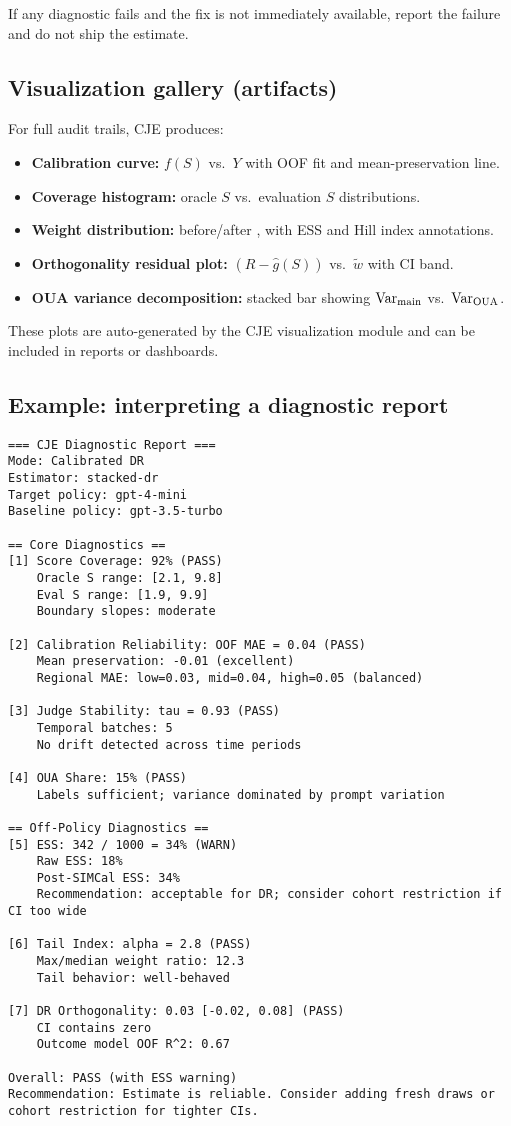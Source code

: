 If any diagnostic fails and the fix is not immediately available, report the failure and do not ship the estimate.

\subsection{Visualization gallery (artifacts)}

For full audit trails, CJE produces:
\begin{itemize}
\item \textbf{Calibration curve:} $f(S)$ vs.\ $Y$ with OOF fit and mean-preservation line.
\item \textbf{Coverage histogram:} oracle $S$ vs.\ evaluation $S$ distributions.
\item \textbf{Weight distribution:} before/after \simcal, with ESS and Hill index annotations.
\item \textbf{Orthogonality residual plot:} $(R - \hat{g}(S))$ vs.\ $\tilde{w}$ with CI band.
\item \textbf{OUA variance decomposition:} stacked bar showing $\operatorname{Var}_{\text{main}}$ vs.\ $\operatorname{Var}_{\text{OUA}}$.
\end{itemize}

These plots are auto-generated by the CJE visualization module and can be included in reports or dashboards.

\subsection{Example: interpreting a diagnostic report}

\begin{lstlisting}
=== CJE Diagnostic Report ===
Mode: Calibrated DR
Estimator: stacked-dr
Target policy: gpt-4-mini
Baseline policy: gpt-3.5-turbo

== Core Diagnostics ==
[1] Score Coverage: 92% (PASS)
    Oracle S range: [2.1, 9.8]
    Eval S range: [1.9, 9.9]
    Boundary slopes: moderate

[2] Calibration Reliability: OOF MAE = 0.04 (PASS)
    Mean preservation: -0.01 (excellent)
    Regional MAE: low=0.03, mid=0.04, high=0.05 (balanced)

[3] Judge Stability: tau = 0.93 (PASS)
    Temporal batches: 5
    No drift detected across time periods

[4] OUA Share: 15% (PASS)
    Labels sufficient; variance dominated by prompt variation

== Off-Policy Diagnostics ==
[5] ESS: 342 / 1000 = 34% (WARN)
    Raw ESS: 18%
    Post-SIMCal ESS: 34%
    Recommendation: acceptable for DR; consider cohort restriction if CI too wide

[6] Tail Index: alpha = 2.8 (PASS)
    Max/median weight ratio: 12.3
    Tail behavior: well-behaved

[7] DR Orthogonality: 0.03 [-0.02, 0.08] (PASS)
    CI contains zero
    Outcome model OOF R^2: 0.67

Overall: PASS (with ESS warning)
Recommendation: Estimate is reliable. Consider adding fresh draws or cohort restriction for tighter CIs.
\end{lstlisting}

